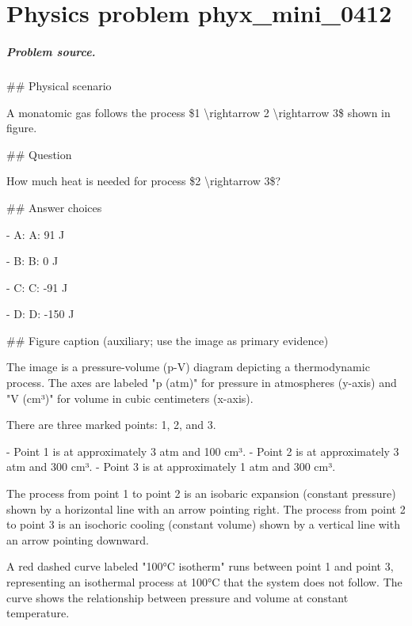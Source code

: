 
\chapter{Physics problem phyx\_mini\_0412}
\label{ch:PhyXMiniProblems_problem_phyx_mini_0412}

\paragraph{Problem source.}
\#\# Physical scenario

A monatomic gas follows the process \$1 \textbackslash{}rightarrow 2 \textbackslash{}rightarrow 3\$ shown in figure.

\#\# Question

How much heat is needed for process \$2 \textbackslash{}rightarrow 3\$?

\#\# Answer choices

- A: A: 91 J

- B: B: 0 J

- C: C: -91 J

- D: D: -150 J

\#\# Figure caption (auxiliary; use the image as primary evidence)

The image is a pressure-volume (p-V) diagram depicting a thermodynamic process. The axes are labeled "p (atm)" for pressure in atmospheres (y-axis) and "V (cm³)" for volume in cubic centimeters (x-axis).

There are three marked points: 1, 2, and 3. 

- Point 1 is at approximately 3 atm and 100 cm³.
- Point 2 is at approximately 3 atm and 300 cm³.
- Point 3 is at approximately 1 atm and 300 cm³.

The process from point 1 to point 2 is an isobaric expansion (constant pressure) shown by a horizontal line with an arrow pointing right. The process from point 2 to point 3 is an isochoric cooling (constant volume) shown by a vertical line with an arrow pointing downward.

A red dashed curve labeled "100°C isotherm" runs between point 1 and point 3, representing an isothermal process at 100°C that the system does not follow. The curve shows the relationship between pressure and volume at constant temperature.

